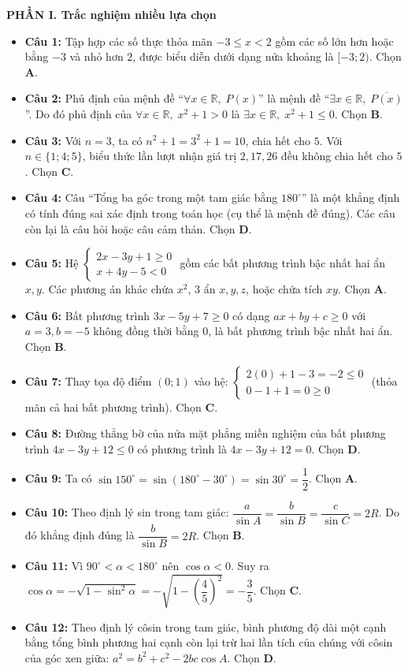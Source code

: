 \documentclass[12pt,a4paper]{article}
\begin{document}
\textbf{PHẦN I. Trắc nghiệm nhiều lựa chọn}
\begin{itemize}[leftmargin=0.6cm, itemsep=3pt]
    \item \textbf{Câu 1:} Tập hợp các số thực thỏa mãn $-3 \le x < 2$ gồm các số lớn hơn hoặc bằng $-3$ và nhỏ hơn $2$, được biểu diễn dưới dạng nửa khoảng là $[-3; 2)$. Chọn \textbf{A}.
    \item \textbf{Câu 2:} Phủ định của mệnh đề ``$\forall x \in \mathbb{R},\; P(x)$'' là mệnh đề ``$\exists x \in \mathbb{R},\; \overline{P(x)}$''. Do đó phủ định của $\forall x \in \mathbb{R},\; x^2 + 1 > 0$ là $\exists x \in \mathbb{R},\; x^2 + 1 \le 0$. Chọn \textbf{B}.
    \item \textbf{Câu 3:} Với $n = 3$, ta có $n^2 + 1 = 3^2 + 1 = 10$, chia hết cho $5$. Với $n \in \{1; 4; 5\}$, biểu thức lần lượt nhận giá trị $2, 17, 26$ đều không chia hết cho $5$. Chọn \textbf{C}.
    \item \textbf{Câu 4:} Câu ``Tổng ba góc trong một tam giác bằng $180^\circ$'' là một khẳng định có tính đúng sai xác định trong toán học (cụ thể là mệnh đề đúng). Các câu còn lại là câu hỏi hoặc câu cảm thán. Chọn \textbf{D}.
    \item \textbf{Câu 5:} Hệ $\begin{cases} 2x - 3y + 1 \ge 0 \\ x + 4y - 5 < 0 \end{cases}$ gồm các bất phương trình bậc nhất hai ẩn $x, y$. Các phương án khác chứa $x^2$, 3 ẩn $x, y, z$, hoặc chứa tích $xy$. Chọn \textbf{A}.
    \item \textbf{Câu 6:} Bất phương trình $3x - 5y + 7 \ge 0$ có dạng $ax + by + c \ge 0$ với $a = 3, b = -5$ không đồng thời bằng $0$, là bất phương trình bậc nhất hai ẩn. Chọn \textbf{B}.
    \item \textbf{Câu 7:} Thay tọa độ điểm $(0; 1)$ vào hệ: $\begin{cases} 2(0) + 1 - 3 = -2 \le 0 \\ 0 - 1 + 1 = 0 \ge 0 \end{cases}$ (thỏa mãn cả hai bất phương trình). Chọn \textbf{C}.
    \item \textbf{Câu 8:} Đường thẳng bờ của nửa mặt phẳng miền nghiệm của bất phương trình $4x - 3y + 12 \le 0$ có phương trình là $4x - 3y + 12 = 0$. Chọn \textbf{D}.
    \item \textbf{Câu 9:} Ta có $\sin 150^\circ = \sin(180^\circ - 30^\circ) = \sin 30^\circ = \dfrac{1}{2}$. Chọn \textbf{A}.
    \item \textbf{Câu 10:} Theo định lý sin trong tam giác: $\dfrac{a}{\sin A} = \dfrac{b}{\sin B} = \dfrac{c}{\sin C} = 2R$. Do đó khẳng định đúng là $\dfrac{b}{\sin B} = 2R$. Chọn \textbf{B}.
    \item \textbf{Câu 11:} Vì $90^\circ < \alpha < 180^\circ$ nên $\cos \alpha < 0$. Suy ra $\cos \alpha = -\sqrt{1 - \sin^2 \alpha} = -\sqrt{1 - \left(\dfrac{4}{5}\right)^2} = -\dfrac{3}{5}$. Chọn \textbf{C}.
    \item \textbf{Câu 12:} Theo định lý côsin trong tam giác, bình phương độ dài một cạnh bằng tổng bình phương hai cạnh còn lại trừ hai lần tích của chúng với côsin của góc xen giữa: $a^2 = b^2 + c^2 - 2bc \cos A$. Chọn \textbf{D}.
\end{itemize}
\end{document}

